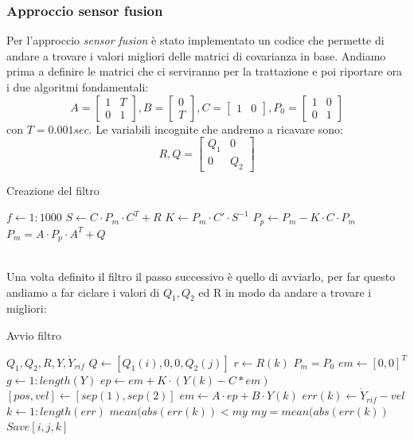 \subsubsection*{Approccio sensor fusion}
Per l'approccio \textit{sensor fusion} è stato implementato un codice che permette di andare a trovare i valori migliori delle matrici di covarianza in base. Andiamo prima a definire le matrici che ci serviranno per la trattazione e poi riportare ora i due algoritmi fondamentali:
\begin{equation}
A = \begin{bmatrix}
1 & T \\ 0 & 1
\end{bmatrix}, B = \begin{bmatrix}
0 \\ T
\end{bmatrix}, C=\begin{bmatrix}
 1 & 0
\end{bmatrix}, P_0 = \begin{bmatrix}
1 & 0 \\ 0 & 1
\end{bmatrix}
\end{equation}
con $T = 0.001 sec$.  Le variabili incognite che andremo a ricavare sono:
\begin{equation}
R , Q = \begin{bmatrix}
Q_1 & 0 \\ 0 & Q_2
\end{bmatrix}
\end{equation}
\begin{algorithm}
\caption{Creazione del filtro}\label{alg:cap}
\begin{algorithmic}
\For $f \gets 1 : 1000$ 
\State $S \gets C\cdot P_m \cdot C^T + R$
\State $K \gets P_m \cdot C'\cdot S^{-1}$
\State $P_p \gets P_m - K\cdot C\cdot P_m$
\State $P_m = A\cdot P_p\cdot A^T + Q$
\EndFor
\end{algorithmic}
\end{algorithm}
\\Una volta definito il filtro il passo successivo è quello di avviarlo, per far questo andiamo a far ciclare i valori di $Q_1,Q_2$ ed R in modo da andare a trovare i migliori: 
\begin{algorithm}
\caption{Avvio filtro}\label{alg:avvio}
\begin{algorithmic}
\Require $Q_1, Q_2, R,Y,\dot{Y}_{rif}$
\State $Q \gets [Q_1(i),0,0,Q_2(j)]$
\State $r \gets R(k)$
\State $P_m = P_0$
\State $em \gets [0,0]^T$
\For $ g \gets 1 : length(Y)$
\State $ ep \gets em + K\cdot (Y(k)-C*em)$
\State $ [pos,vel] \gets [sep(1),sep(2)]$
 \State $em \gets A\cdot ep + B\cdot Y(k)$
 \State $err(k) \gets \dot{Y}_{rif} - vel$
\EndFor
\For $k \gets 1:length(err)$
\If $mean(abs(err(k)) < my$
\State $my = mean(abs(err(k))$
\State $ Save [i,j,k]$
\EndIf
\EndFor
\EndFor
\EndFor
\EndFor
\end{algorithmic}
\end{algorithm}
